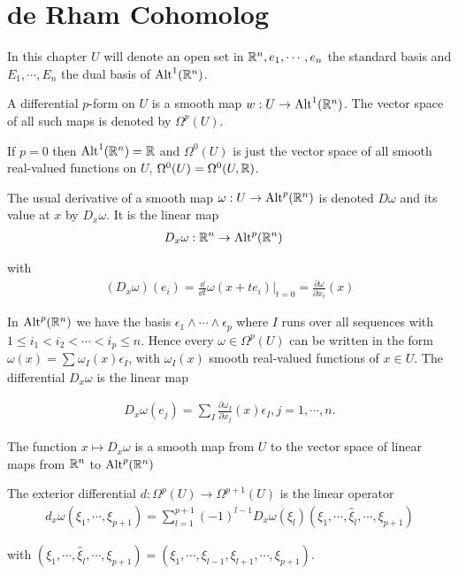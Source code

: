 \chapter{de Rham Cohomolog}
In this chapter $U$ will denote an open set in $\mathbb{R}^n, {e_1,\cdots, e_n}$ the standard basis
and ${E_1, \cdots,E_n}$ the dual basis of $\operatorname{Alt}^1(\mathbb{R}^n)$.

\begin{definition}
  A differential $p$-form on $U$ is a smooth map $w:U\to \operatorname{Alt}^1(\mathbb{R}^n)$.
The vector space of all such maps is denoted by $\Omega^p(U)$.
\end{definition}

If $p = 0$ then $\operatorname{Alt}^1(\mathbb{R}^n) = \mathbb{R}$ and $\Omega^0(U)$ is just the vector space of all smooth
real-valued functions on $U$, $\Omega^0(U) = \Omega^0(U, \mathbb{R})$.

The usual derivative of a smooth map $\omega:U\to\operatorname{Alt}^p(\mathbb{R}^n)$ is denoted $D\omega$ and its
value at $x$ by $D_x\omega$. It is the linear map
\begin{align*}
  D_x\omega:\mathbb{R}^n &\to \operatorname{Alt}^p(\mathbb{R}^n)
\end{align*}

with 
\begin{align*}
  (D_x\omega)(e_i) 
  = \frac{\dd }{\dd t}\omega(x+te_i)\Big|_{t=0}
  = \frac{\partial \omega}{\partial x_i}(x)
\end{align*}

In $\operatorname{Alt}^p(\mathbb{R}^n)$ we have the basis $\epsilon_1\wedge\cdots\wedge\epsilon_p$ where 
$I$ runs over all sequences with $1\le i_1<i_2<\cdots<i_p\le n$. Hence every $\omega\in\Omega^p(U)$ 
can be written in the form $\omega(x) = \sum_{}^{}{\omega_I(x)\epsilon_I}$, with $\omega_I(x)$ smooth 
real-valued functions of $x\in U$. The differential $D_x\omega$ is the linear map

\begin{align}\label{eq:3-1}
  D_{x}\omega(e_{j})=\sum_{I}\frac{\partial\omega_{I}}{\partial x_{j}}(x)\epsilon_{I} , j=1,\cdots,n.
\end{align}

The function $x\mapsto D_x\omega$ is a smooth map from $U$ to the vector space of linear
maps from $\mathbb{R}^n$ to $\operatorname{Alt}^p(\mathbb{R}^n)$


\begin{definition}\label{def:3-2}
  The exterior differential $d:\Omega^p(U)\to \Omega^{p+1}(U)$ is 
  the linear operator
  \begin{align*}
    d_x\omega(\xi_1,\cdots,\xi_{p+1})
    = \sum_{l=1}^{p+1}\left(-1\right)^{l-1}D_x\omega(\xi_l)(\xi_1,\cdots,\hat{\xi}_l,\cdots,\xi_{p+1})
  \end{align*}

  with $(\xi_1,\cdots,\hat{\xi}_l,\cdots,\xi_{p+1}) = (\xi_1, \cdots, \xi_{l-1}, \xi_{l+1}, \cdots, \xi_{p+1})$.
\end{definition}


